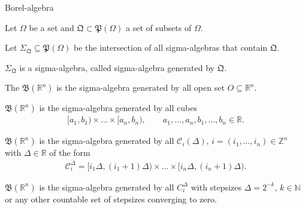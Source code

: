 \begin{frame}{Borel-algebra}
\bit
\item Let $\Omega$ be a set and $\mathfrak{Q}\subset\mathfrak{P}(\Omega)$ a set of subsets of $\Omega$. 
\item Let $\Sigma_{\mathfrak{Q}}\subseteq\mathfrak{P}(\Omega)$ be the intersection of all sigma-algebras that contain $\mathfrak{Q}$. 
\item $\Sigma_{\mathfrak{Q}}$ is a sigma-algebra, called sigma-algebra generated by $\mathfrak{Q}$. 
\eit 


\bit
\item[\iarrow] The  $\mathfrak{B}(\mathbb{R}^n)$ is the sigma-algebra generated by all open set $O\subseteq\mathbb{R}^n$. 
\eit
\vspace{-0.4cm}
\bit
\item $\mathfrak{B}(\mathbb{R}^n)$ is the sigma-algebra generated by all cubes
\begin{align*}
[a_1,b_1)\times\dots\times[a_n,b_n),\qquad a_1,\dots,a_n,b_1,\dots,b_n\in\mathbb{R}.
\end{align*}
\item $\mathfrak{B}(\mathbb{R}^n)$ is the sigma-algebra generated by all  
$\mathcal{C}_i(\Delta)$, $i=(i_1,\dots,i_n)\in\mathbb{Z}^n$ with  $\Delta\in\mathbb{R}$ of the form
\begin{align}\label{UniQuantCells}
\mathcal{C}_i^{\Delta}= [i_1\Delta,(i_1+1)\Delta)\times\dots\times[i_n\Delta,(i_n+1)\Delta). 
\end{align}
\item $\mathfrak{B}(\mathbb{R}^n)$ is the sigma-algebra generated by all  $C_i^{\Delta}$ 
with  stepsizes $\Delta=2^{-k}$, $k\in\mathbb{N}$ or any other countable set of stepsizes converging to zero.  
\eit
\end{frame}



